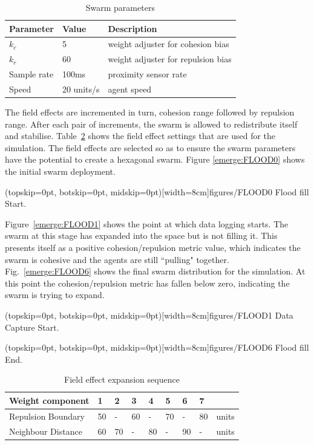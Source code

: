 \documentclass{ieeeaccess}
\begin{document}
\begin{table}[H]
\begin{center}
\begin{tabular}{| p{1.8cm} | p{1.5cm} | p{4.0cm} |}
\hline
\bf Parameter & \bf Value  & \bf Description \\ \hline
$k_c$         & 5          & weight adjuster for cohesion bias\\ \hline
$k_r$         & 60         & weight adjuster for repulsion bias\\ \hline
Sample rate   & 100ms      & proximity sensor rate\\ \hline
Speed         & 20 units/s & agent speed\\ \hline
\end{tabular}\caption{Swarm parameters} \label{tab:FillParameters1}
\end{center}
\end{table}

The field effects are incremented in turn, cohesion range followed by repulsion
range. After each pair of increments, the swarm is allowed to redistribute
itself and stabilise. Table~\ref{tab:FillSequence} shows the field effect
settings that are used for the simulation. The field effects are selected so as
to ensure the swarm parameters have the potential to create a hexagonal swarm.
Figure \ref{emerge:FLOOD0} shows the initial swarm deployment.

\Figure[t!](topskip=0pt, botskip=0pt, midskip=0pt)[width=8cm]{figures/FLOOD0}
{Flood fill Start.\label{emerge:FLOOD0}}

Figure~\ref{emerge:FLOOD1} shows the point at which data logging starts. The
swarm at this stage has expanded into the space but is not filling it. This
presents itself as a positive cohesion/repulsion metric value, which indicates
the swarm is cohesive and the agents are still ``pulling" together.
Fig.~\ref{emerge:FLOOD6} shows the final swarm distribution for the simulation.
At this point the cohesion/repulsion metric has fallen below zero, indicating
the swarm is trying to expand. 

\Figure[t!](topskip=0pt, botskip=0pt, midskip=0pt)[width=8cm]{figures/FLOOD1}
{Data Capture Start.\label{emerge:FLOOD1}}

\Figure[t!](topskip=0pt, botskip=0pt, midskip=0pt)[width=8cm]{figures/FLOOD6}
{Flood fill End.\label{emerge:FLOOD6}}

\begin{table}[H]
\begin{center}
\begin{tabular}{| p{1.8cm} | p{0.3cm} | p{0.3cm} | p{0.3cm} | p{0.3cm} | p{0.3cm} | p{0.3cm} | p{0.3cm} | p{0.7cm} |}
\hline
\bf Weight \bf component & \bf 1 & \bf 2 & \bf 3 & \bf 4 & \bf 5 & \bf 6 & \bf 7 & \\ \hline
Repulsion Boundary & 50 & -  & 60 & -  & 70 & -  & 80 & units\\  \hline
Neighbour Distance & 60 & 70 & -  & 80 & -  & 90 & -  & units\\  \hline
\end{tabular}\caption{Field effect expansion sequence} \label{tab:FillSequence}
\end{center}
\end{table}
\end{document}
